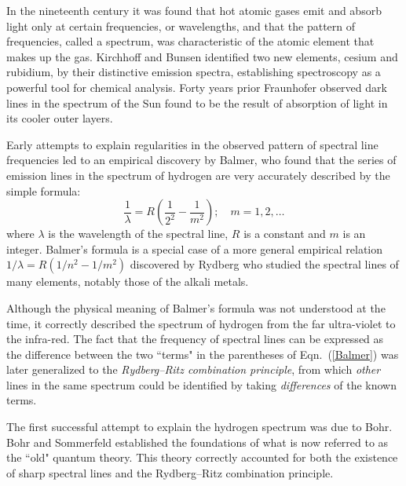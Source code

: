 \documentclass[12pt]{article}
\begin{document}
In the nineteenth century it was found that hot atomic gases emit and absorb light only at certain frequencies, or wavelengths, and that the pattern of frequencies, called a spectrum, was characteristic of the atomic element that makes up the gas. Kirchhoff and Bunsen identified two new elements, cesium and rubidium, by their distinctive emission spectra, establishing spectroscopy as a powerful tool for chemical analysis. Forty years prior Fraunhofer observed dark lines in the spectrum of the Sun found to be the result of absorption of light in its cooler outer layers.

Early attempts to explain regularities in the observed pattern of spectral line frequencies led to an empirical discovery by Balmer, who found that the series of emission lines in the spectrum of hydrogen are very accurately described by the simple formula:
\begin{equation}\label{Balmer}
    \frac{1}{\lambda} = R \left(\frac{1}{2^2}-\frac{1}{m^2}\right); \quad m=1,2,\dots
\end{equation}
where $\lambda$ is the wavelength of the spectral line, $R$ is a constant and $m$ is an integer. Balmer's formula is a special case of a more general empirical relation $1/\lambda = R \left(1/n^2-1/m^2\right)$ discovered by Rydberg who studied the spectral lines of many elements, notably those of the alkali metals.

Although the physical meaning of Balmer's formula was not understood at the time, it correctly described the spectrum of hydrogen from the far ultra-violet to the infra-red. The fact that the frequency of spectral lines can be expressed as the difference between the two ``terms" in the parentheses of Eqn.~(\ref{Balmer}) was later generalized to the \textit{Rydberg--Ritz combination principle}, from which \textit{other} lines in the same spectrum could be identified by taking \textit{differences} of the known terms.

The first successful attempt to explain the hydrogen spectrum was due to Bohr. Bohr and Sommerfeld established the foundations of what is now referred to as the ``old" quantum theory. This theory correctly accounted for both the existence of sharp spectral lines and the Rydberg--Ritz combination principle.
\end{document}
